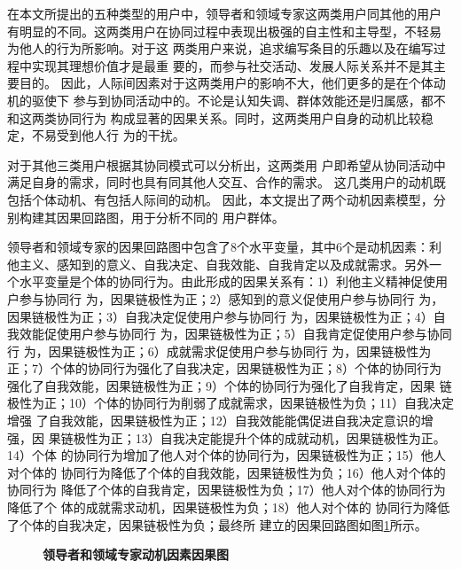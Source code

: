 在本文所提出的五种类型的用户中，领导者和领域专家这两类用户同其他的用户
有明显的不同。这两类用户在协同过程中表现出极强的自主性和主导型，不轻易
为他人的行为所影响。对于这
两类用户来说，追求编写条目的乐趣以及在编写过程中实现其理想价值才是最重
要的，而参与社交活动、发展人际关系并不是其主要目的\cite{Rafaeli2008}。
因此，人际间因素对于这两类用户的影响不大，他们更多的是在个体动机的驱使下
参与到协同活动中的。不论是认知失调、群体效能还是归属感，都不和这两类协同行为
构成显著的因果关系。同时，这两类用户自身的动机比较稳定，不易受到他人行
为的干扰。

对于其他三类用户根据其协同模式可以分析出，这两类用
户即希望从协同活动中满足自身的需求，同时也具有同其他人交互、合作的需求。
这几类用户的动机既包括个体动机、有包括人际间的动机。
因此，本文提出了两个动机因素模型，分别构建其因果回路图，用于分析不同的
用户群体。

领导者和领域专家的因果回路图中包含了8个水平变量，其中6个是动机因素：利
他主义、感知到的意义、自我决定、自我效能、自我肯定以及成就需求。另外一
个水平变量是个体的协同行为。由此形成的因果关系有：1）利他主义精神促使用户参与协同行
为，因果链极性为正；2）感知到的意义促使用户参与协同行
为，因果链极性为正；3）自我决定促使用户参与协同行
为，因果链极性为正；4）自我效能促使用户参与协同行
为，因果链极性为正；5）自我肯定促使用户参与协同行
为，因果链极性为正；6）成就需求促使用户参与协同行
为，因果链极性为正；7）个体的协同行为强化了自我决定，因果链极性为正；8）个体的协同行为
强化了自我效能，因果链极性为正；9）个体的协同行为强化了自我肯定，因果
链极性为正；10）个体的协同行为削弱了成就需求，因果链极性为负；11）自我决定增强
了自我效能，因果链极性为正；12）自我效能能偶促进自我决定意识的增强，因
果链极性为正；13）自我决定能提升个体的成就动机，因果链极性为正。14）个体
的协同行为增加了他人对个体的协同行为，因果链极性为正；15）他人对个体的
协同行为降低了个体的自我效能，因果链极性为负；16）他人对个体的协同行为
降低了个体的自我肯定，因果链极性为负；17）他人对个体的协同行为降低了个
体的成就需求动机，因果链极性为负；18）他人对个体的
协同行为降低了个体的自我决定，因果链极性为负；最终所
建立的因果回路图如图\ref{fig:motive1}所示。
\begin{figure}[htb]
  \centering
  \caption{\small{\textbf{领导者和领域专家动机因素因果图}}}
  \label{fig:motive1}
\end{figure}


